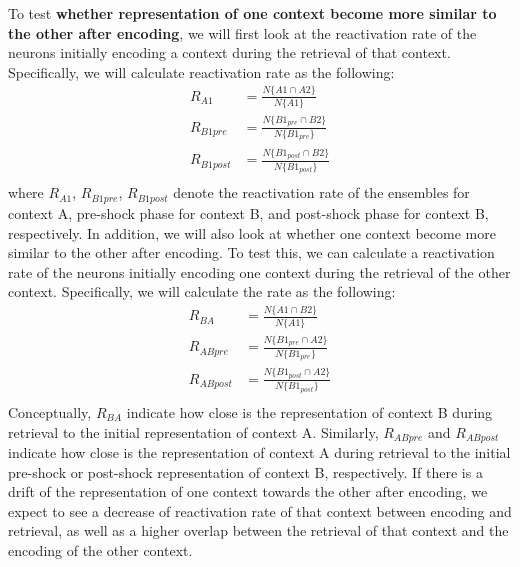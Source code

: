 \documentclass[master.tex]{subfiles}
\begin{document}
To test \textbf{whether representation of one context become more similar to the
  other after encoding}, we will first look at the reactivation rate of the
neurons initially encoding a context during the retrieval of that context.
Specifically, we will calculate reactivation rate as the following:
\begin{align*}
  R_{A1} & = \frac{N\{A1 \cap A2\}}{N\{A1\}} \\
  R_{B1pre} & = \frac{N\{B1_{pre} \cap B2\}}{N\{B1_{pre}\}} \\
  R_{B1post} & = \frac{N\{B1_{post} \cap B2\}}{N\{B1_{post}\}} \\
\end{align*}
where $R_{A1}$, $R_{B1pre}$, $R_{B1post}$ denote the reactivation rate of the
ensembles for context A, pre-shock phase for context B, and post-shock phase for
context B, respectively. In addition, we will also look at whether one context
become more similar to the other after encoding. To test this, we can calculate
a reactivation rate of the neurons initially encoding one context during the
retrieval of the other context. Specifically, we will calculate the rate as the
following:
\begin{align*}
  R_{BA} & = \frac{N\{A1 \cap B2\}}{N\{A1\}} \\
  R_{ABpre} & = \frac{N\{B1_{pre} \cap A2\}}{N\{B1_{pre}\}} \\
  R_{ABpost} & = \frac{N\{B1_{post} \cap A2\}}{N\{B1_{post}\}} \\
\end{align*}
Conceptually, $R_{BA}$ indicate how close is the representation of context B
during retrieval to the initial representation of context A. Similarly,
$R_{ABpre}$ and $R_{ABpost}$indicate how close is the representation of context
A during retrieval to the initial pre-shock or post-shock representation of
context B, respectively. If there is a drift of the representation of one
context towards the other after encoding, we expect to see a decrease of
reactivation rate of that context between encoding and retrieval, as well as a
higher overlap between the retrieval of that context and the encoding of the
other context.
\end{document}
